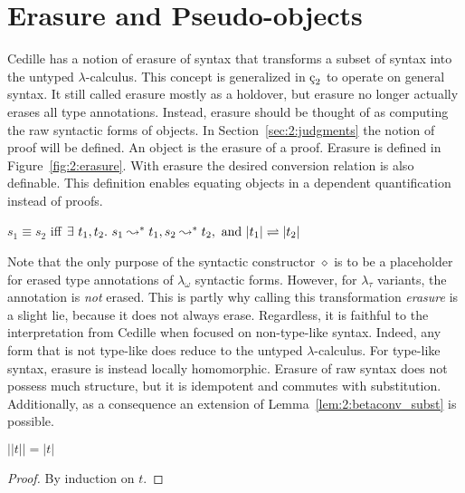 \section{Erasure and Pseudo-objects}
\label{sec:2:erasure}

Cedille has a notion of erasure of syntax that transforms a subset of syntax into the untyped $\lambda$-calculus.
This concept is generalized in $\ced$ to operate on general syntax.
It still called erasure mostly as a holdover, but erasure no longer actually erases all type annotations.
Instead, erasure should be thought of as computing the raw syntactic forms of objects.
In Section~\ref{sec:2:judgments} the notion of proof will be defined.
An object is the erasure of a proof.
Erasure is defined in Figure~\ref{fig:2:erasure}.
With erasure the desired conversion relation is also definable.
This definition enables equating objects in a dependent quantification instead of proofs.

\begin{definition}
    \label{def:2:conv}
    $s_1 \equiv s_2$ iff $\exists\ t_1, t_2.\ s_1 \leadsto^* t_1, s_2 \leadsto^* t_2, \text{ and } |t_1| \rightleftharpoons |t_2|$
\end{definition}



Note that the only purpose of the syntactic constructor $\diamond$ is to be a placeholder for erased type annotations of $\lambda_\omega$ syntactic forms.
However, for $\lambda_\tau$ variants, the annotation is \textit{not} erased.
This is partly why calling this transformation \textit{erasure} is a slight lie, because it does not always erase.
Regardless, it is faithful to the interpretation from Cedille when focused on non-type-like syntax.
Indeed, any form that is not type-like does reduce to the untyped $\lambda$-calculus.
For type-like syntax, erasure is instead locally homomorphic.
Erasure of raw syntax does not possess much structure, but it is idempotent and commutes with substitution.
Additionally, as a consequence an extension of Lemma~\ref{lem:2:betaconv_subst} is possible.

\begin{lemma}
    \label{lem:2:erasure_idempotent}
    $||t|| = |t|$
\end{lemma}
\begin{proof}
    By induction on $t$.
\end{proof}

